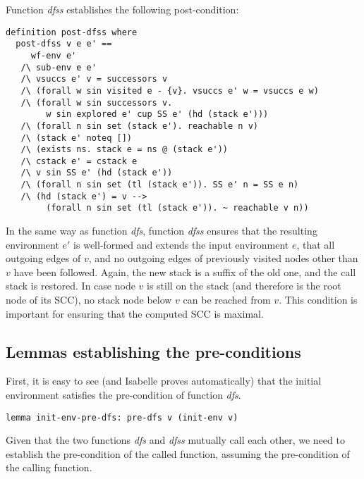 \documentclass[sigplan,10pt,anonymous,review]{acmart}
\newcommand{\prog}[1]{\textit{#1}}
\begin{document}
Function \prog{dfss} establishes the following post-condition:

\begin{small}
\begin{lstlisting}[language=isabelle]
definition post-dfss where 
  post-dfss v e e' == 
     wf-env e'
   /\ sub-env e e'
   /\ vsuccs e' v = successors v
   /\ (forall w sin visited e - {v}. vsuccs e' w = vsuccs e w)
   /\ (forall w sin successors v.
        w sin explored e' cup SS e' (hd (stack e')))
   /\ (forall n sin set (stack e'). reachable n v)
   /\ (stack e' noteq [])
   /\ (exists ns. stack e = ns @ (stack e'))
   /\ cstack e' = cstack e
   /\ v sin SS e' (hd (stack e'))
   /\ (forall n sin set (tl (stack e')). SS e' n = SS e n)
   /\ (hd (stack e') = v -->
        (forall n sin set (tl (stack e')). ~ reachable v n))
\end{lstlisting}
\end{small}

In the same way as function \prog{dfs}, function \prog{dfss} ensures that the resulting environment $e'$ is well-formed and extends the input environment $e$, that all outgoing edges of $v$, and no outgoing edges of previously visited nodes other than $v$ have been followed. Again, the new stack is a suffix of the old one, and the call stack is restored. In case node $v$ is still on the stack (and therefore is the root node of its SCC), no stack node below $v$ can be reached from $v$. This condition is important for ensuring that the computed SCC is maximal.


\subsection{Lemmas establishing the pre-conditions}
\label{sec:pre-pre}

First, it is easy to see (and Isabelle proves automatically) that the initial environment satisfies the pre-condition of function \prog{dfs}.

\begin{small}
\begin{lstlisting}[language=isabelle]
lemma init-env-pre-dfs: pre-dfs v (init-env v)
\end{lstlisting}
\end{small}

Given that the two functions \prog{dfs} and \prog{dfss} mutually call each other, we need to establish the pre-condition of the called function, assuming the pre-condition of the calling function.
\end{document}

